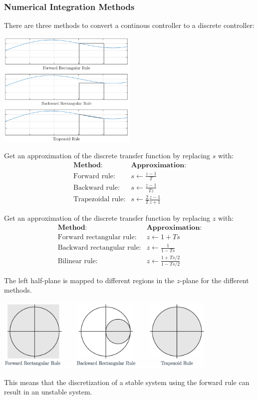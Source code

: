 \subsubsection{Numerical Integration Methods}
There are three methods to convert a continous controller to a discrete controller:
\begin{center}
	\includegraphics[width=0.5\textwidth]{Images/Numerical-Integration.png}
\end{center}
Get an approximation of the discrete transfer function by replacing $s$ with:
$$\begin{array}{cc}
		\textbf{Method:}         & \textbf{Approximation:}           \\
		\text{Forward rule:}     & s\gets\frac{z-1}{T}               \\
		\text{Backward rule:}    & s\gets\frac{z-1}{Tz}              \\
		\text{Trapezoidal rule:} & s\gets\frac{2}{T} \frac{z-1}{z+1}
	\end{array}$$

Get an approximation of the discrete transfer function by replacing $z$ with:
$$\begin{array}{cc}
		\textbf{Method:}                  & \textbf{Approximation:}      \\
		\text{Forward rectangular rule:}  & z\gets 1+Ts                  \\
		\text{Backward rectangular rule:} & z\gets \frac{1}{1-Ts}        \\
		\text{Bilinear rule:}             & z\gets \frac{1+Ts/2}{1-Ts/2}
	\end{array}$$

The left half-plane is mapped to different regions in the $z$-plane for the different methods.
\begin{center}
	\includegraphics[width=0.8\textwidth]{Images/digitization-mapping.png}
\end{center}
This means that the discretization of a stable system using the forward rule can result in an unstable system.




